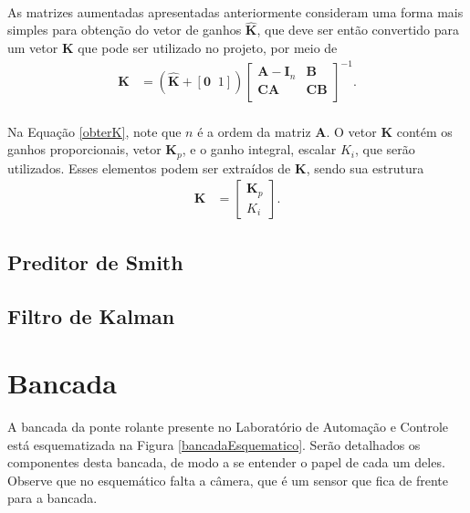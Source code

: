 \paragraph{} As matrizes aumentadas apresentadas anteriormente consideram uma forma mais simples para obtenção do vetor de ganhos $\mathbf{\hat{K}}$, que deve ser então convertido para um vetor $\mathbf{K}$ que pode ser utilizado no projeto, por meio de \begin{align}
	\mathbf{K} &= \left(\mathbf{\hat{K}}+[\mathbf{0}\;\; 1]\right)\left[\begin{array}{cc}
	\mathbf{A}-\mathbf{I}_n & \mathbf{B}\\
	\mathbf{C}\mathbf{A} & \mathbf{C}\mathbf{B}\\
\end{array}
\right]^{-1}.\label{obterK}
\end{align}

\paragraph{} Na Equação \ref{obterK}, note que $n$ é a ordem da matriz $\mathbf{A}$. O vetor $\mathbf{K}$ contém os ganhos proporcionais, vetor $\mathbf{K}_p$, e o ganho integral, escalar $K_i$, que serão utilizados. Esses elementos podem ser extraídos de $\mathbf{K}$, sendo sua estrutura \begin{align}
	\mathbf{K} & = \left[\begin{array}{c}\mathbf{K}_p\\ K_i\end{array}\right].
\end{align}

\subsection{Preditor de Smith}

\subsection{Filtro de Kalman}

\section{Bancada\label{bancada}}
A bancada da ponte rolante presente no Laboratório de Automação e Controle está esquematizada na Figura \ref{bancadaEsquematico}. Serão detalhados os componentes desta bancada, de modo a se entender o papel de cada um deles. Observe que no esquemático falta a câmera, que é um sensor que fica de frente para a bancada. 

